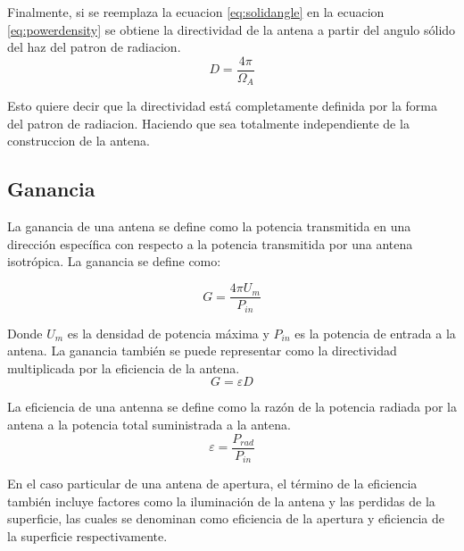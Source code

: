 Finalmente, si se reemplaza la ecuacion \ref{eq:solidangle} en la ecuacion \ref{eq:powerdensity} se obtiene la directividad de la antena a partir del angulo sólido del haz del patron de radiacion.\\

\begin{equation}
    D = \frac{4\pi}{\Omega_{A}}
\end{equation}

Esto quiere decir que la directividad está completamente definida por la forma del patron de radiacion. Haciendo que sea totalmente independiente de la construccion de la antena\cite{stutzman2012antenna}.\\


\subsection{Ganancia}

La ganancia de una antena se define como la potencia transmitida en una dirección específica con respecto a la potencia transmitida por una antena isotrópica. La ganancia se define como:

\begin{equation}
    G = \frac{4\pi U_{m}}{P_{in}}
\end{equation}

Donde $U_{m}$ es la densidad de potencia máxima y $P_{in}$ es la potencia de entrada a la antena. La ganancia también se puede representar como la directividad multiplicada por la eficiencia de la antena.\\

\begin{equation}
    G = \varepsilon D 
\end{equation}

La eficiencia de una antenna se define como la razón de la potencia radiada por la antena a la potencia total suministrada a la antena.\\

\begin{equation}
    \varepsilon = \frac{P_{rad}}{P_{in}}
\end{equation}

En el caso particular de una antena de apertura, el término de la eficiencia también incluye factores como la iluminación de la antena y las perdidas de la superficie, las cuales se denominan como eficiencia de la apertura y eficiencia de la superficie respectivamente.\\

